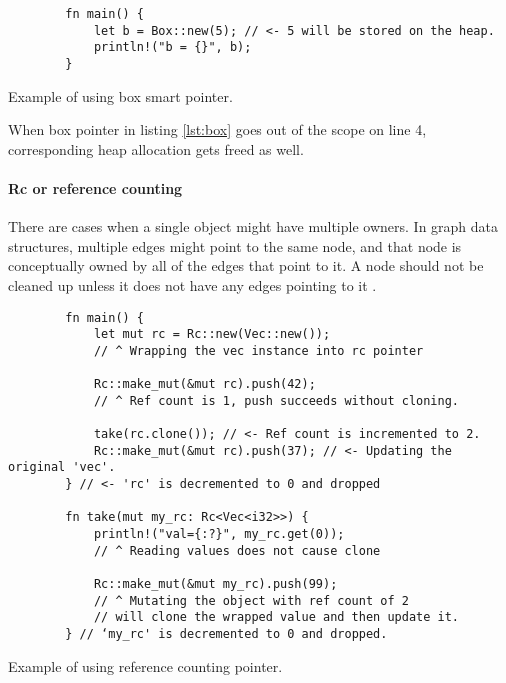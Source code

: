 \begin{listing}[!htbp]

    \centering
    \begin{verbatim}
        fn main() {
            let b = Box::new(5); // <- 5 will be stored on the heap.
            println!("b = {}", b);
        }
    \end{verbatim}

    \caption{Example of using box smart pointer.}
    \label{lst:box}
\end{listing}

When box pointer in listing \ref{lst:box} goes out of the scope on line 4, corresponding heap allocation gets freed as well.

\paragraph{Rc or reference counting}
There are cases when a single object might have multiple owners. In graph data structures, multiple edges might point to the same node, and that node is conceptually owned by all of the edges that point to it. A node should not be cleaned up unless it does not have any edges pointing to it \cite{rust-book-2e}.

\begin{listing}[!htbp]

    \centering
    \begin{verbatim}
        fn main() {
            let mut rc = Rc::new(Vec::new());
            // ^ Wrapping the vec instance into rc pointer

            Rc::make_mut(&mut rc).push(42);
            // ^ Ref count is 1, push succeeds without cloning.

            take(rc.clone()); // <- Ref count is incremented to 2.
            Rc::make_mut(&mut rc).push(37); // <- Updating the original 'vec'.
        } // <- 'rc' is decremented to 0 and dropped

        fn take(mut my_rc: Rc<Vec<i32>>) {
            println!("val={:?}", my_rc.get(0));
            // ^ Reading values does not cause clone

            Rc::make_mut(&mut my_rc).push(99);
            // ^ Mutating the object with ref count of 2
            // will clone the wrapped value and then update it.
        } // ‘my_rc' is decremented to 0 and dropped.
    \end{verbatim}

    \caption{Example of using reference counting pointer.}
    \label{lst:rc}
\end{listing}

